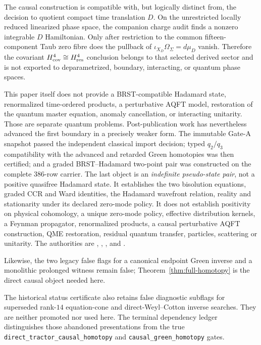 \documentclass[11pt]{article}
\theoremstyle{definition}
\theoremstyle{remark}
\begin{document}
The causal construction is compatible with, but logically distinct from,
the decision to quotient compact time translation $D$.  On the unrestricted
locally reduced linearized phase space, the companion charge audit finds a
nonzero integrable $D$ Hamiltonian.  Only after restriction to the common
fifteen-component Taub zero fibre does the pullback of
$\iota_{X_D}\Omega_\Sigma=d\mu_D$ vanish.  Therefore the covariant
$H^4_{\rm cov}\cong H^4_{\rm res}$ conclusion belongs to that selected
derived sector and is not exported to deparametrized, boundary, interacting,
or quantum phase spaces.

This paper itself does not provide a BRST-compatible Hadamard state,
renormalized time-ordered products, a perturbative AQFT model, restoration of
the quantum master equation, anomaly cancellation, or interacting unitarity.
Those are separate quantum problems.  Post-publication work has nevertheless
advanced the first boundary in a precisely weaker form.  The immutable Gate-A
snapshot passed the independent classical import decision; typed \(q_2/q_3\)
compatibility with the advanced and retarded Green homotopies was then
certified; and a graded BRST--Hadamard two-point pair was constructed on the
complete 386-row carrier.  The last object is an \emph{indefinite pseudo-state
pair}, not a positive quasifree Hadamard state.  It establishes the two
bisolution equations, graded CCR and Ward identities, the Hadamard wavefront
relation, reality and stationarity under its declared zero-mode policy.  It
does not establish positivity on physical cohomology, a unique zero-mode
policy, effective distribution kernels, a Feynman propagator, renormalized
products, a causal perturbative AQFT construction, QME restoration, residual
quantum transfer, particles, scattering or unitarity.  The authorities are
,
,
,
and
.

Likewise, the two legacy false flags
for a canonical endpoint Green inverse and a monolithic prolonged witness
remain false; Theorem~\ref{thm:full-homotopy} is the direct causal object
needed here.

The historical status certificate also retains false diagnostic subflags
for superseded rank-$14$ equation-cone and direct-Weyl--Cotton inverse
searches.  They are neither promoted nor used here.  The terminal dependency
ledger distinguishes those abandoned presentations from the true
\texttt{direct\_tractor\_causal\_homotopy} and
\texttt{causal\_green\_homotopy} gates.
\end{document}
